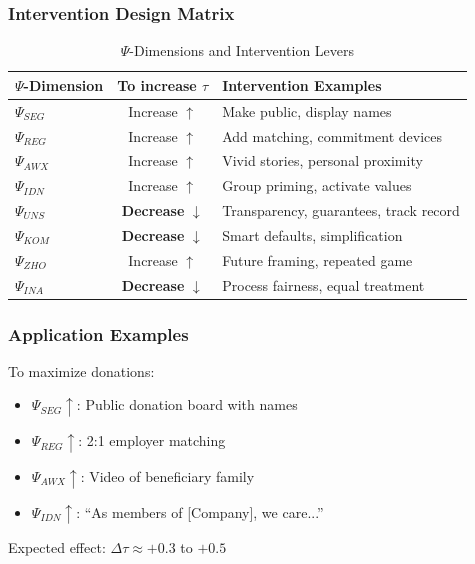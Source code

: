 \subsubsection{Intervention Design Matrix}

\begin{table}[htbp]
\centering
\caption{$\Psi$-Dimensions and Intervention Levers}
\label{tab:intervention-matrix}
\renewcommand{\arraystretch}{1.2}
\begin{tabular}{@{}lcl@{}}
\toprule
\textbf{$\Psi$-Dimension} & \textbf{To increase $\tau$} & \textbf{Intervention Examples} \\
\midrule
$\Psi_{SEG}$ & Increase $\uparrow$ & Make public, display names \\
$\Psi_{REG}$ & Increase $\uparrow$ & Add matching, commitment devices \\
$\Psi_{AWX}$ & Increase $\uparrow$ & Vivid stories, personal proximity \\
$\Psi_{IDN}$ & Increase $\uparrow$ & Group priming, activate values \\
$\Psi_{UNS}$ & \textbf{Decrease} $\downarrow$ & Transparency, guarantees, track record \\
$\Psi_{KOM}$ & \textbf{Decrease} $\downarrow$ & Smart defaults, simplification \\
$\Psi_{ZHO}$ & Increase $\uparrow$ & Future framing, repeated game \\
$\Psi_{INA}$ & \textbf{Decrease} $\downarrow$ & Process fairness, equal treatment \\
\bottomrule
\end{tabular}
\end{table}

\subsubsection{Application Examples}

\begin{example}
To maximize donations:
\begin{itemize}
\item $\Psi_{SEG} \uparrow$: Public donation board with names
\item $\Psi_{REG} \uparrow$: 2:1 employer matching
\item $\Psi_{AWX} \uparrow$: Video of beneficiary family
\item $\Psi_{IDN} \uparrow$: ``As members of [Company], we care...''
\end{itemize}
Expected effect: $\Delta\tau \approx +0.3$ to $+0.5$
\end{example}

